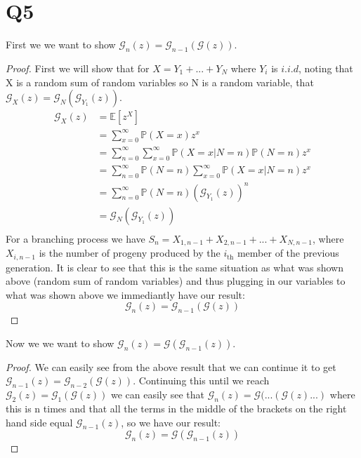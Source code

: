 \documentclass{article}
\begin{document}
\section*{Q5}
First we we want to show $\mathcal{G}_n(z)=\mathcal{G}_{n-1}(\mathcal{G}(z))$.
\begin{proof}
First we will show that for $X=Y_1+...+Y_N$ where $Y_i$ is $i.i.d$, noting that X is a random sum of random variables so N is a random variable, that $\mathcal{G}_X(z)=\mathcal{G}_N(\mathcal{G}_{Y_1}(z))$.
\begin{align*}
\mathcal{G}_X(z)&=\mathbb{E}[z^X]\\
&=\sum_{x=0}^{\infty}\mathbb{P}(X=x)z^x\\
&=\sum_{n=0}^{\infty}\sum_{x=0}^{\infty}\mathbb{P}(X=x|N=n)\mathbb{P}(N=n)z^x\\
&=\sum_{n=0}^{\infty}\mathbb{P}(N=n)\sum_{x=0}^{\infty}\mathbb{P}(X=x|N=n)z^x\\
&=\sum_{n=0}^{\infty}\mathbb{P}(N=n)(\mathcal{G}_{Y_1}(z))^n\\
&=\mathcal{G}_N(\mathcal{G}_{Y_1}(z))\\
\end{align*}
For a branching process we have $S_n=X_{1,n-1}+X_{2,n-1}+...+X_{N,n-1}$, where $X_{i,n-1}$ is the number of progeny produced by the $i_{\text{th}}$ member of the previous generation. It is clear to see that this is the same situation as what was shown above (random sum of random variables) and thus plugging in our variables to what was shown above we immediantly have our result:
$$\mathcal{G}_n(z)=\mathcal{G}_{n-1}(\mathcal{G}(z))$$
\end{proof}
\noindent Now we we want to show $\mathcal{G}_n(z)=\mathcal{G}(\mathcal{G}_{n-1}(z))$.
\begin{proof}
We can easily see from the above result that we can continue it to get $\mathcal{G}_{n-1}(z)=\mathcal{G}_{n-2}(\mathcal{G}(z))$. Continuing this until we reach $\mathcal{G}_2(z)=\mathcal{G}_{1}(\mathcal{G}(z))$ we can easily see that $\mathcal{G}_n(z)=\mathcal{G}(...(\mathcal{G}(z)...)$ where this is n times and that all the terms in the middle of the brackets on the right hand side equal $\mathcal{G}_{n-1}(z)$, so we have our result:
$$\mathcal{G}_n(z)=\mathcal{G}(\mathcal{G}_{n-1}(z))$$
\end{proof}
\end{document}

